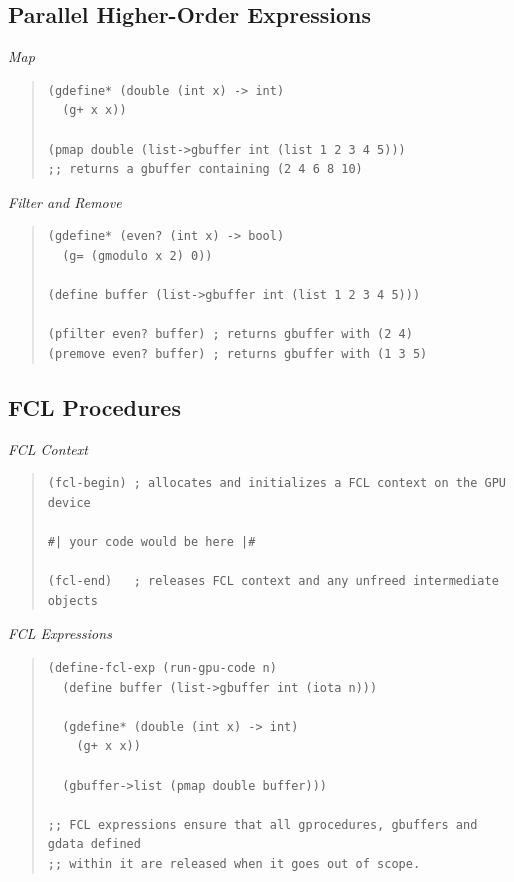 \documentclass{article}
\begin{document}
{\subsection{Parallel Higher-Order Expressions}

{\emph{Map}}
\begin{quote}
\begin{verbatim}
(gdefine* (double (int x) -> int)
  (g+ x x))

(pmap double (list->gbuffer int (list 1 2 3 4 5)))
;; returns a gbuffer containing (2 4 6 8 10)
\end{verbatim}
\end{quote}

{\emph{Filter and Remove}}

\begin{quote}
\begin{verbatim}
(gdefine* (even? (int x) -> bool)
  (g= (gmodulo x 2) 0))

(define buffer (list->gbuffer int (list 1 2 3 4 5)))

(pfilter even? buffer) ; returns gbuffer with (2 4)
(premove even? buffer) ; returns gbuffer with (1 3 5)
\end{verbatim}
\end{quote}

\subsection{FCL Procedures}

{\emph{FCL Context}}
\begin{quote}
\begin{verbatim}
(fcl-begin) ; allocates and initializes a FCL context on the GPU device

#| your code would be here |#

(fcl-end)   ; releases FCL context and any unfreed intermediate objects
\end{verbatim}
\end{quote}

{\emph{FCL Expressions}}
\begin{quote}
\begin{verbatim}
(define-fcl-exp (run-gpu-code n)
  (define buffer (list->gbuffer int (iota n)))

  (gdefine* (double (int x) -> int)
    (g+ x x))

  (gbuffer->list (pmap double buffer)))

;; FCL expressions ensure that all gprocedures, gbuffers and gdata defined
;; within it are released when it goes out of scope.
\end{verbatim}
\end{quote}

}
\end{document}
